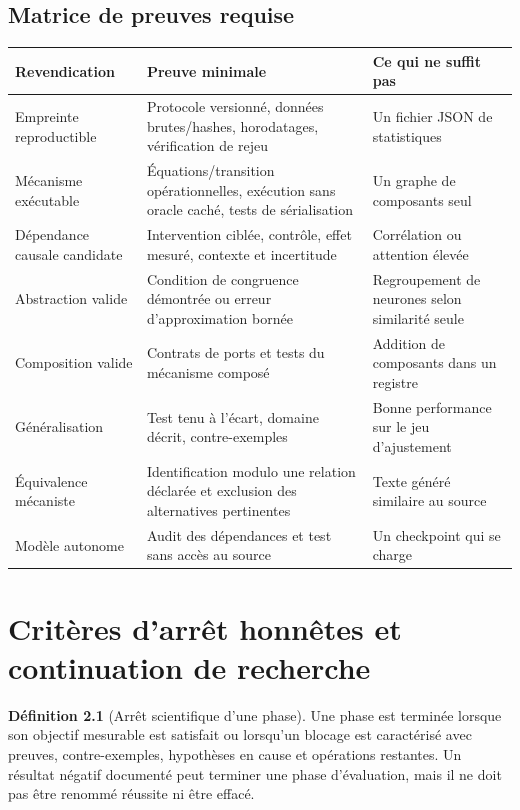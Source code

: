 \documentclass[11pt,oneside]{book}
\theoremstyle{definition}
\newtheorem{definition}[theoreme]{Définition}
\theoremstyle{remark}
\newcommand{\1}{\mathbf 1}
\begin{document}
\section{Matrice de preuves requise}
\begin{longtable}{>{\raggedright\arraybackslash}p{}>{\raggedright\arraybackslash}p{}>{\raggedright\arraybackslash}p{}}
\toprule
\textbf{Revendication} & \textbf{Preuve minimale} & \textbf{Ce qui ne suffit pas}\\
\midrule
Empreinte reproductible & Protocole versionné, données brutes/hashes, horodatages, vérification de rejeu & Un fichier JSON de statistiques\\
Mécanisme exécutable & Équations/transition opérationnelles, exécution sans oracle caché, tests de sérialisation & Un graphe de composants seul\\
Dépendance causale candidate & Intervention ciblée, contrôle, effet mesuré, contexte et incertitude & Corrélation ou attention élevée\\
Abstraction valide & Condition de congruence démontrée ou erreur d'approximation bornée & Regroupement de neurones selon similarité seule\\
Composition valide & Contrats de ports et tests du mécanisme composé & Addition de composants dans un registre\\
Généralisation & Test tenu à l'écart, domaine décrit, contre-exemples & Bonne performance sur le jeu d'ajustement\\
Équivalence mécaniste & Identification modulo une relation déclarée et exclusion des alternatives pertinentes & Texte généré similaire au source\\
Modèle autonome & Audit des dépendances et test sans accès au source & Un checkpoint qui se charge\\
\bottomrule
\end{longtable}

\chapter{Critères d'arrêt honnêtes et continuation de recherche}
\begin{definition}[Arrêt scientifique d'une phase]
Une phase est terminée lorsque son objectif mesurable est satisfait ou lorsqu'un blocage est caractérisé avec preuves, contre-exemples, hypothèses en cause et opérations restantes. Un résultat négatif documenté peut terminer une phase d'évaluation, mais il ne doit pas être renommé réussite ni être effacé.
\end{definition}
\end{document}
